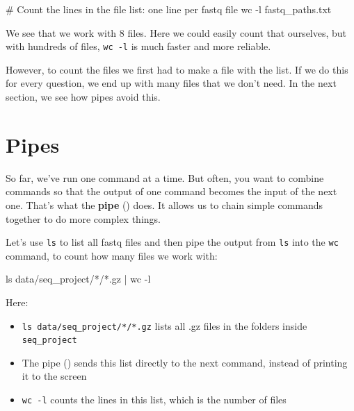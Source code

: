 \documentclass[
  letterpaper,
  DIV=11,
  numbers=noendperiod]{scrreprt}
\newenvironment{Shaded}{}{}
\newcommand{\AttributeTok}[1]{\textcolor[rgb]{0.84,0.23,0.29}{#1}}
\newcommand{\CommentTok}[1]{\textcolor[rgb]{0.42,0.45,0.49}{#1}}
\newcommand{\FunctionTok}[1]{\textcolor[rgb]{0.44,0.26,0.76}{#1}}
\newcommand{\KeywordTok}[1]{\textcolor[rgb]{0.84,0.23,0.29}{#1}}
\newcommand{\NormalTok}[1]{\textcolor[rgb]{0.14,0.16,0.18}{#1}}
\newcommand{\PreprocessorTok}[1]{\textcolor[rgb]{0.84,0.23,0.29}{#1}}
\providecommand{\tightlist}{%
  \setlength{\itemsep}{0pt}\setlength{\parskip}{0pt}}
\begin{document}
\begin{Shaded}
\begin{Highlighting}[]
\CommentTok{\# Count the lines in the file list: one line per fastq file}
\FunctionTok{wc} \AttributeTok{{-}l}\NormalTok{ fastq\_paths.txt}
\end{Highlighting}
\end{Shaded}

We see that we work with 8 files. Here we could easily count that
ourselves, but with hundreds of files, \texttt{wc\ -l} is much faster
and more reliable.

However, to count the files we first had to make a file with the list.
If we do this for every question, we end up with many files that we
don't need. In the next section, we see how pipes avoid this.

\section{Pipes}\label{pipes}

So far, we've run one command at a time. But often, you want to combine
commands so that the output of one command becomes the input of the next
one. That's what the \textbf{pipe} (\texttt{\textbar{}}) does. It allows
us to chain simple commands together to do more complex things.

Let's use \texttt{ls} to list all fastq files and then pipe the output
from \texttt{ls} into the \texttt{wc} command, to count how many files
we work with:

\begin{Shaded}
\begin{Highlighting}[]
\FunctionTok{ls}\NormalTok{ data/seq\_project/}\PreprocessorTok{*}\NormalTok{/}\PreprocessorTok{*}\NormalTok{.gz }\KeywordTok{|} \FunctionTok{wc} \AttributeTok{{-}l}
\end{Highlighting}
\end{Shaded}

Here:

\begin{itemize}
\tightlist
\item
  \texttt{ls\ data/seq\_project/*/*.gz} lists all .gz files in the
  folders inside \texttt{seq\_project}
\item
  The pipe (\texttt{\textbar{}}) sends this list directly to the next
  command, instead of printing it to the screen
\item
  \texttt{wc\ -l} counts the lines in this list, which is the number of
  files
\end{itemize}
\end{document}
